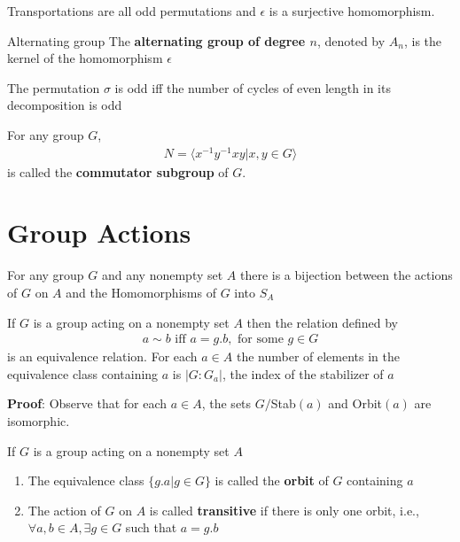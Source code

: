\documentclass[titlepage, 12pt]{book}
\begin{document}
\begin{proposition}{}{}
    Transportations are all odd permutations and $\epsilon$ is a surjective
    homomorphism.
\end{proposition}
\begin{definition}{Alternating group}{}
    The \textbf{alternating group of degree $n$}, denoted by $A_n$, is the
    kernel of the homomorphism $\epsilon$
\end{definition}
\begin{proposition}{}{}
    The permutation $\sigma$ is odd iff the number of cycles of even length in
    its decomposition is odd
\end{proposition}
\begin{definition}{}{}
    For any group $G$,
    \begin{gather*}
        N = \langle x^{-1}y^{-1}xy | x, y\in G\rangle
    \end{gather*}
    is called the \textbf{commutator subgroup} of $G$.
\end{definition}

\chapter{Group Actions}

\begin{proposition}{}{}
    For any group $G$ and any nonempty set $A$ there is a bijection between the
    actions of $G$ on $A$ and the Homomorphisms of $G$ into $S_A$
\end{proposition}

\begin{proposition}{}{}
    If $G$ is a group acting on a nonempty set $A$ then the relation defined by
    \begin{align*}
        a\sim b\textrm{ iff } a = g.b,\textrm{ for some } g\in G
    \end{align*}
    is an equivalence relation. For each $a\in A$ the number of elements in the
    equivalence class containing $a$ is $|G:G_a|$, the index of the stabilizer
    of $a$
\end{proposition}
\textbf{Proof}: Observe that for each $a\in A$, the sets $G/$Stab$(a)$ and
Orbit$(a)$ are isomorphic.

\begin{definition}{}{}
    If $G$ is a group acting on a nonempty set $A$
    \begin{enumerate}
        \item The equivalence class $\{g.a | g\in G\}$ is called the
            \textbf{orbit} of $G$ containing $a$
        \item The action of $G$ on $A$ is called \textbf{transitive} if there
            is only one orbit, i.e., $\forall a, b\in A, \exists g\in G$ such
            that $a = g.b$
    \end{enumerate}
\end{definition}
\end{document}
